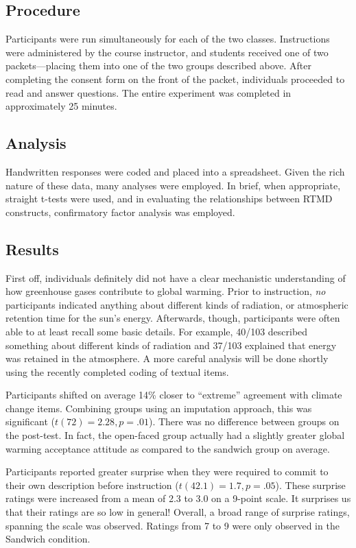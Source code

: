 \subsection{Procedure}

Participants were run simultaneously for each of the two classes. Instructions
were administered by the course instructor, and students received one of two
packets---placing them into one of the two groups described above. After
completing the consent form on the front of the packet, individuals proceeded to
read and answer questions. The entire experiment was completed in approximately
25 minutes.

\subsection{Analysis}

Handwritten responses were coded and placed into a spreadsheet. Given the rich
nature of these data, many analyses were employed. In brief, when appropriate,
straight t-tests were used, and in evaluating the relationships between RTMD
constructs, confirmatory factor analysis was employed.

\subsection{Results}

First off, individuals definitely did not have a clear mechanistic understanding
of how greenhouse gases contribute to global warming. Prior to instruction,
\emph{no} participants indicated anything about different kinds of radiation, or
atmospheric retention time for the sun's energy. Afterwards, though,
participants were often able to at least recall some basic details. For example,
40/103 described something about different kinds of radiation and 37/103
explained that energy was retained in the atmosphere. A more careful analysis
will be done shortly using the recently completed coding of textual items.

Participants shifted on average 14\% closer to “extreme” agreement with climate
change items. Combining groups using an imputation approach, this was
significant ($t(72)=2.28, p=.01$). There was no difference between groups on the post-test. In fact, the open-faced
group actually had a slightly greater global warming acceptance
attitude as compared to the sandwich group on average. 

Participants reported greater surprise when they were required to commit to
their own description before instruction ($t(42.1)=1.7, p=.05$). These surprise
ratings were increased from a mean of 2.3 to 3.0 on a 9-point scale. It
surprises us that their ratings are so low in general! Overall, a broad range of
surprise ratings, spanning the scale was observed. Ratings from 7 to 9 were only
observed in the Sandwich condition.

